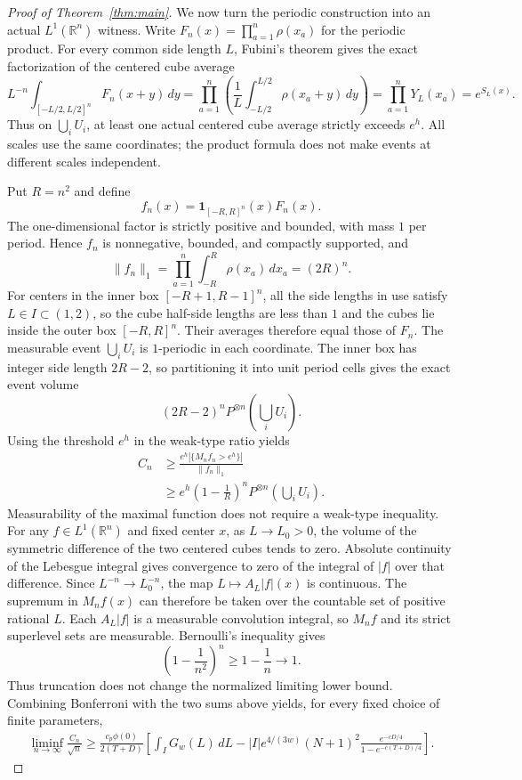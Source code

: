 \documentclass[a4paper,11pt]{article}
\theoremstyle{remark}
\begin{document}
\begin{proof}[Proof of Theorem~\ref{thm:main}]
We now turn the periodic construction into an actual $L^1(\mathbb R^n)$ witness. Write
$F_n(x)=\prod_{a=1}^n\rho(x_a)$ for the periodic product. For every common side length $L$,
Fubini's theorem gives the exact factorization of the centered cube average
\[
 L^{-n}\int_{[-L/2,L/2]^n}F_n(x+y)\,dy
 =\prod_{a=1}^n\left(\frac1L\int_{-L/2}^{L/2}\rho(x_a+y)\,dy\right)
 =\prod_{a=1}^nY_L(x_a)=e^{S_L(x)}.
\]
Thus on $\bigcup_iU_i$, at least one actual centered cube average strictly exceeds $e^h$.
All scales use the same coordinates; the product formula does not make events at different scales independent.

Put $R=n^2$ and define
\[
 f_n(x)=\mathbf1_{[-R,R]^n}(x)F_n(x).
\]
The one-dimensional factor is strictly positive and bounded, with mass $1$ per period. Hence $f_n$ is nonnegative, bounded, and compactly supported, and
\[
 \|f_n\|_1=\prod_{a=1}^n\int_{-R}^R\rho(x_a)\,dx_a=(2R)^n.
\]
For centers in the inner box $[-R+1,R-1]^n$, all the side lengths in use satisfy $L\in I\subset(1,2)$,
so the cube half-side lengths are less than $1$ and the cubes lie inside the outer box $[-R,R]^n$.
Their averages therefore equal those of $F_n$.
The measurable event $\bigcup_iU_i$ is $1$-periodic in each coordinate. The inner box has integer side length
$2R-2$, so partitioning it into unit period cells gives the exact event volume
\[
 (2R-2)^nP^{\otimes n}\left(\bigcup_iU_i\right).
\]
Using the threshold $e^h$ in the weak-type ratio yields
\begin{align*}
 C_n&\ge\frac{e^h|\{M_nf_n>e^h\}|}{\|f_n\|_1}\\
 &\ge e^h\left(1-\frac1R\right)^n
 P^{\otimes n}\left(\bigcup_iU_i\right).
\end{align*}
Measurability of the maximal function does not require a weak-type inequality. For any
$f\in L^1(\mathbb R^n)$ and fixed center $x$, as $L\to L_0>0$,
the volume of the symmetric difference of the two centered cubes tends to zero. Absolute continuity of the Lebesgue integral gives
convergence to zero of the integral of $|f|$ over that difference. Since $L^{-n}\to L_0^{-n}$,
the map $L\mapsto A_L|f|(x)$ is continuous. The supremum in $M_nf(x)$ can therefore be taken over
the countable set of positive rational $L$. Each $A_L|f|$ is a measurable convolution integral,
so $M_nf$ and its strict superlevel sets are measurable.
Bernoulli's inequality gives
\[
 \left(1-\frac1{n^2}\right)^n\ge1-\frac1n\longrightarrow1.
\]
Thus truncation does not change the normalized limiting lower bound. Combining Bonferroni with the two sums above yields,
for every fixed choice of finite parameters,
\begin{align*}
 \liminf_{n\to\infty}\frac{C_n}{\sqrt n}
 \ge\frac{c_p\phi(0)}{2(T+D)}\left[
 \int_I G_w(L)\,dL
 -|I|e^{4/(3w)}(N+1)^2
 \frac{e^{-cD/4}}{1-e^{-c(T+D)/4}}\right].
\end{align*}


\end{proof}
\end{document}
